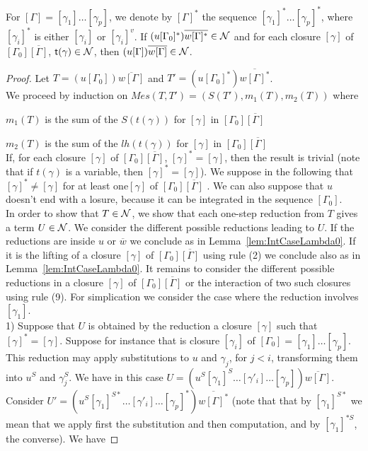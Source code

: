 \documentclass[orivec]{llncs}
\begin{document}
\begin{ALlemma}\label{lem:IntCaseSharing0}
For $[\Gamma] = [\gamma_1] \dots[\gamma_p]$, we denote by $[\Gamma]^*$ the sequence $[\gamma_1]^* \dots[\gamma_p]^*$, where $[\gamma_i]^*$ is either $[\gamma_i]$ or $[\gamma_i]^v$.
 If $(u[\Gamma_0]^*)\overline{w[\Gamma]^*} \in \mathcal{N}$ and for each closure $[\gamma]$ of $[\Gamma_0]\overline{[\Gamma]}$,  ${\mathsf{t}} (\gamma)\in\mathcal{N}$, then $(u[\Gamma])\overline{w[\Gamma]} \in \mathcal{N}$.
\end{ALlemma}

\begin{proof}

  Let $T = (u[\Gamma_0])\overline{w[\Gamma]}$ and $T' = (u[\Gamma_0]^*)\overline{w[\Gamma]^*}$.
\\
We proceed by induction on $Mes(T,T') = (S(T'), m_1(T), m_2(T))$ where

 $m_1(T)$ is the sum of the $S(t(\gamma))$ for  $[\gamma]$ in $[\Gamma_0]\overline{[\Gamma]}$

 $m_2(T)$ is the sum of the $lh(t(\gamma))$ for $[\gamma]$ in $[\Gamma_0]\overline{[\Gamma]}$
 \\
If,  for each closure $[\gamma]$ of $[\Gamma_0]\overline{[\Gamma]}$,  $[\gamma]^* = [\gamma]$, then the result is trivial (note that if $t(\gamma)$ is a variable, then  $[\gamma]^* = [\gamma]$). We suppose in the following that $[\gamma]^* \neq [\gamma]$ for at least one$[\gamma]$ of $[\Gamma_0]\overline{[\Gamma]}$ . We can also suppose that $u$ doesn't end with a losure, because it can be integrated in the sequence $[\Gamma_0]$.
\\
In order to show that $T\in\mathcal{N}$, we show that each one-step reduction from $T$ gives a term $U\in\mathcal{N}$. We consider the different possible reductions leading to $U$. If the reductions are inside $u$ or $\overline{w}$ we conclude as in Lemma~\ref{lem:IntCaseLambda0}. If it is the lifting of a closure $[\gamma]$ of $[\Gamma_0]\overline{[\Gamma]}$ using rule (2) we conclude also as in Lemma~\ref{lem:IntCaseLambda0}. It remains to consider the different possible reductions in a closure $[\gamma]$ of $[\Gamma_0]\overline{[\Gamma]}$ or the interaction of two such closures using rule (9). For simplication we consider the case where the reduction involves $[\gamma_1]$.
%
%
\medskip
\\
1) Suppose that $U$ is obtained by the reduction a closure $[\gamma]$ such that  $[\gamma]^* = [\gamma]$. Suppose for instance that is closure $[\gamma_i]$ of $[\Gamma_0] = [\gamma_1] \dots[\gamma_p]$. This reduction  may apply substitutions to $u$ and $\gamma_j$, for $j<i$, transforming them into $u^S$ and $\gamma_j^S$. We have in this case $U = (u^S[\gamma_1]^S \dots [\gamma'_i]\dots [\gamma_p])\overline{w[\Gamma]}$.
\\
Consider $U' = (u^S[\gamma_1]^{S*} \dots [\gamma'_i]\dots [\gamma_p]^*)\overline{w[\Gamma]^*}$ (note that that by $[\gamma_1]^{S*}$ we mean that we apply first the substitution and then computation, and by $[\gamma_1]^{*S}$, the converse).  We have


\end{proof}
\end{document}
